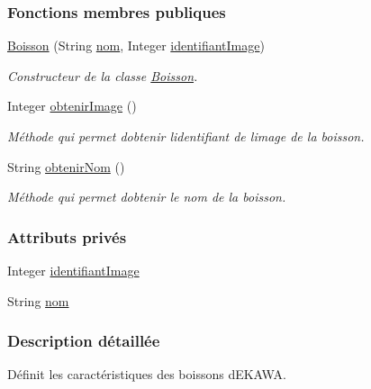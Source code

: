 \subsubsection*{Fonctions membres publiques}
\begin{DoxyCompactItemize}
\item 
\hyperlink{classcom_1_1example_1_1ekawa_1_1_boisson_a4dd8019f54eb6d1293a179ffe5e8b918}{Boisson} (String \hyperlink{classcom_1_1example_1_1ekawa_1_1_boisson_a9c932ca6665790c36acb6d4792a5a31a}{nom}, Integer \hyperlink{classcom_1_1example_1_1ekawa_1_1_boisson_ac73d259d39e459b00e5cfdf73a2aaf98}{identifiant\+Image})
\begin{DoxyCompactList}\small\item\em Constructeur de la classe \hyperlink{classcom_1_1example_1_1ekawa_1_1_boisson}{Boisson}. \end{DoxyCompactList}\item 
Integer \hyperlink{classcom_1_1example_1_1ekawa_1_1_boisson_a6edf9114dd70c1c16382136e57e6d345}{obtenir\+Image} ()
\begin{DoxyCompactList}\small\item\em Méthode qui permet d\textquotesingle{}obtenir l\textquotesingle{}identifiant de l\textquotesingle{}image de la boisson. \end{DoxyCompactList}\item 
String \hyperlink{classcom_1_1example_1_1ekawa_1_1_boisson_a410781851622f3c4b87a30d7381f9082}{obtenir\+Nom} ()
\begin{DoxyCompactList}\small\item\em Méthode qui permet d\textquotesingle{}obtenir le nom de la boisson. \end{DoxyCompactList}\end{DoxyCompactItemize}
\subsubsection*{Attributs privés}
\begin{DoxyCompactItemize}
\item 
Integer \hyperlink{classcom_1_1example_1_1ekawa_1_1_boisson_ac73d259d39e459b00e5cfdf73a2aaf98}{identifiant\+Image}
\item 
String \hyperlink{classcom_1_1example_1_1ekawa_1_1_boisson_a9c932ca6665790c36acb6d4792a5a31a}{nom}
\end{DoxyCompactItemize}


\subsubsection{Description détaillée}
Définit les caractéristiques des boissons d\textquotesingle{}E\+K\+A\+WA. 


